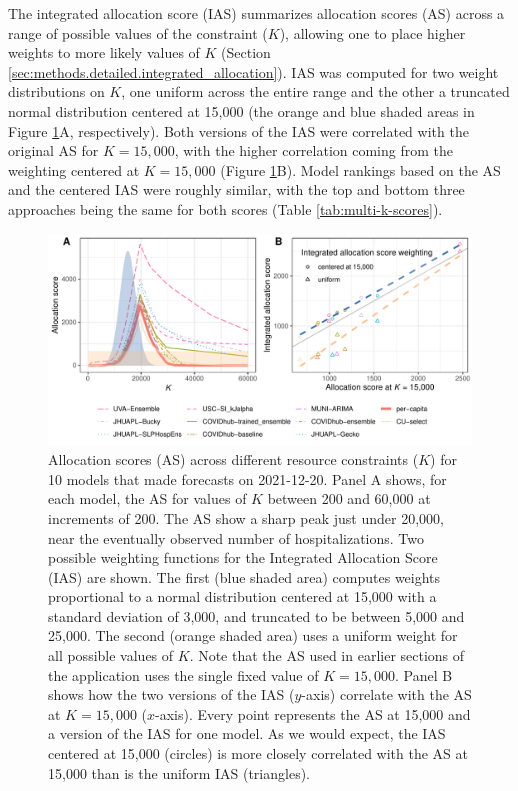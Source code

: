 \documentclass{article}\usepackage[]{graphicx}\usepackage[]{xcolor}
\makeatletter
\def\maxwidth{ %
  \ifdim\Gin@nat@width>\linewidth
    \linewidth
  \else
    \Gin@nat@width
  \fi
}
\newenvironment{knitrout}{}{} %
\makeatother
\begin{document}
The integrated allocation score (IAS) summarizes allocation scores (AS) across a range of possible values of the
constraint ($K$), allowing one to place higher weights to more likely values of $K$ (Section
\ref{sec:methods.detailed.integrated_allocation}). IAS was computed for two weight distributions on $K$, one uniform
across the entire range and the other a truncated normal distribution centered at 15,000 (the orange and blue shaded areas in Figure
\ref{fig:multi-k}A, respectively). Both versions of the IAS were correlated with the original AS for $K=15,000$, with
the higher correlation coming from the weighting centered at $K=15,000$ (Figure \ref{fig:multi-k}B). Model rankings
based on the AS and the centered IAS were roughly similar, with the top and bottom three approaches being the same for
both scores (Table \ref{tab:multi-k-scores}).

\begin{knitrout}
\color{fgcolor}\begin{figure}[H]
\includegraphics[width=\maxwidth]{figure/multi-k-1} \caption[Allocation scores (AS) across different resource constraints ($K$) for 10 models that made forecasts on 2021-12-20]{Allocation scores (AS) across different resource constraints ($K$) for 10 models that made forecasts on 2021-12-20. Panel A shows, for each model, the AS for values of $K$ between 200 and 60,000 at increments of 200. The AS show a sharp peak just under 20,000, near the eventually observed number of hospitalizations. Two possible weighting functions for the Integrated Allocation Score (IAS) are shown. The first (blue shaded area) computes weights proportional to a normal distribution centered at 15,000 with a standard deviation of 3,000, and truncated to be between 5,000 and 25,000. The second (orange shaded area) uses a uniform weight for all possible values of $K$. Note that the AS used in earlier sections of the application uses the single fixed value of $K=15,000$.  Panel B shows how the two versions of the IAS ($y$-axis) correlate with the AS at $K=15,000$ ($x$-axis). Every point represents the AS at 15,000 and a version of the IAS for one model. As we would expect, the IAS centered at 15,000 (circles) is more closely correlated with the AS at 15,000 than is the uniform IAS (triangles).}\label{fig:multi-k}
\end{figure}

\end{knitrout}
\end{document}
